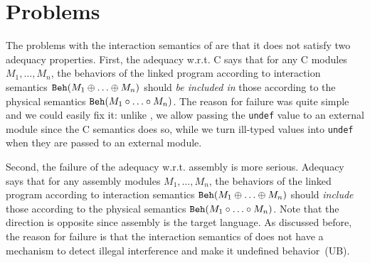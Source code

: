 \section{Problems}
\label{sec:compiler:problems}

The problems with the interaction semantics of \ccc{} are that it does
not satisfy two adequacy properties. First, the adequacy w.r.t. C says
that for any C modules $M_1,\ldots,M_n$, the behaviors of the linked
program according to interaction semantics $\mathtt{Beh}({M_1 \oplus
  \ldots \oplus M_n})$ should \emph{be included in} those according to the
physical semantics $\mathtt{Beh}({M_1 \circ \ldots\circ M_n})$.  The reason for
failure was quite simple and we could easily fix it: unlike \ccc{}, we allow passing
the \texttt{undef} value to an external module since the C semantics
does so, while we turn ill-typed values into \texttt{undef} when they
are passed to an external module.

Second, the failure of the adequacy w.r.t. assembly is more serious.
Adequacy says that for any assembly modules $M_1,\ldots,M_n$,
the behaviors of the linked program according to interaction
semantics $\mathtt{Beh}({M_1 \oplus \ldots \oplus M_n})$ should \emph{include}
those according to the physical semantics $\mathtt{Beh}({M_1 \circ \ldots\circ M_n})$.
Note that the direction is opposite since assembly is the target language.
As discussed before, the reason for failure is that
the interaction semantics of \ccc{} does not have a mechanism to detect
illegal interference and make it undefined behavior~(UB).
